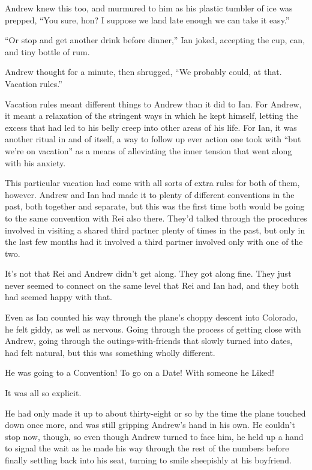 \documentclass[12pt,letterpaper,oneside]{memoir}
\begin{document}
  Andrew knew this too, and murmured to him as his plastic tumbler of ice was prepped, ``You sure, hon? I suppose we land late enough we can take it easy.''

  ``Or stop and get another drink before dinner,'' Ian joked, accepting the cup, can, and tiny bottle of rum.

  Andrew thought for a minute, then shrugged, ``We probably could, at that. Vacation rules.''

  Vacation rules meant different things to Andrew than it did to Ian. For Andrew, it meant a relaxation of the stringent ways in which he kept himself, letting the excess that had led to his belly creep into other areas of his life. For Ian, it was another ritual in and of itself, a way to follow up ever action one took with ``but we're on vacation'' as a means of alleviating the inner tension that went along with his anxiety.

  This particular vacation had come with all sorts of extra rules for both of them, however. Andrew and Ian had made it to plenty of different conventions in the past, both together and separate, but this was the first time both would be going to the same convention with Rei also there. They'd talked through the procedures involved in visiting a shared third partner plenty of times in the past, but only in the last few months had it involved a third partner involved only with one of the two.

  It's not that Rei and Andrew didn't get along. They got along fine. They just never seemed to connect on the same level that Rei and Ian had, and they both had seemed happy with that.

  Even as Ian counted his way through the plane's choppy descent into Colorado, he felt giddy, as well as nervous. Going through the process of getting close with Andrew, going through the outings-with-friends that slowly turned into dates, had felt natural, but this was something wholly different.

  He was going to a Convention! To go on a Date! With someone he Liked!

  It was all so explicit.

  He had only made it up to about thirty-eight or so by the time the plane touched down once more, and was still gripping Andrew's hand in his own. He couldn't stop now, though, so even though Andrew turned to face him, he held up a hand to signal the wait as he made his way through the rest of the numbers before finally settling back into his seat, turning to smile sheepishly at his boyfriend.
\end{document}
